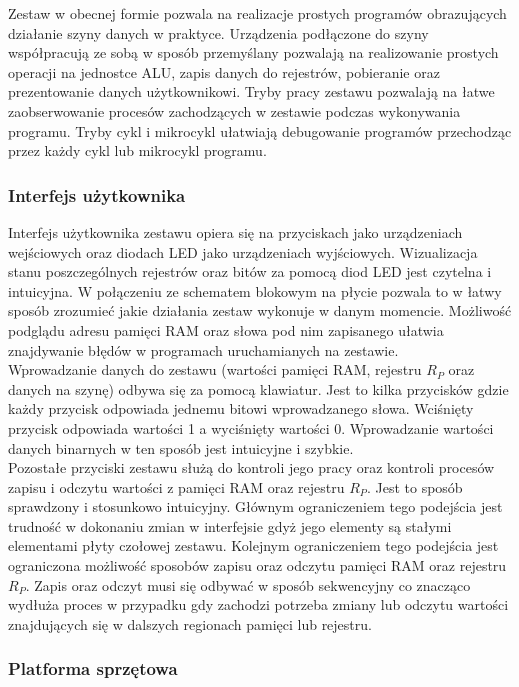 \documentclass[../main.tex]{subfiles}
\begin{document}
    Zestaw w obecnej formie pozwala na realizacje prostych programów obrazujących działanie szyny danych w praktyce. Urządzenia podłączone do szyny
    współpracują ze sobą w sposób przemyślany pozwalają na realizowanie prostych operacji na jednostce ALU, zapis danych do rejestrów, pobieranie
    oraz prezentowanie danych użytkownikowi. Tryby pracy zestawu pozwalają na łatwe zaobserwowanie procesów zachodzących w zestawie podczas
    wykonywania programu. Tryby cykl i mikrocykl ułatwiają debugowanie programów przechodząc przez każdy cykl lub mikrocykl programu.

    \subsubsection{Interfejs użytkownika}

    Interfejs użytkownika zestawu opiera się na przyciskach jako urządzeniach wejściowych oraz diodach LED jako urządzeniach wyjściowych. Wizualizacja
    stanu poszczególnych rejestrów oraz bitów za pomocą diod LED jest czytelna i intuicyjna. W połączeniu ze schematem blokowym na płycie pozwala
    to w łatwy sposób zrozumieć jakie działania zestaw wykonuje w danym momencie. Możliwość podglądu adresu pamięci RAM oraz słowa 
    pod nim zapisanego ułatwia znajdywanie błędów w programach uruchamianych na zestawie.
    \\
    Wprowadzanie danych do zestawu (wartości pamięci RAM, rejestru $R_P$ oraz danych na szynę) odbywa się za pomocą klawiatur. Jest to kilka przycisków
    gdzie każdy przycisk odpowiada jednemu bitowi wprowadzanego słowa. Wciśnięty przycisk odpowiada wartości 1 a wyciśnięty wartości 0.
    Wprowadzanie wartości danych binarnych w ten sposób jest intuicyjne i szybkie.
    \\
    Pozostałe przyciski zestawu służą do kontroli jego pracy oraz kontroli procesów zapisu i odczytu wartości z pamięci RAM oraz rejestru $R_P$.
    Jest to sposób sprawdzony i stosunkowo intuicyjny. Głównym ograniczeniem tego podejścia jest trudność w dokonaniu zmian w interfejsie gdyż
    jego elementy są stałymi elementami płyty czołowej zestawu. Kolejnym ograniczeniem tego podejścia jest ograniczona możliwość sposobów zapisu oraz 
    odczytu pamięci RAM oraz rejestru $R_P$. Zapis oraz odczyt musi się odbywać w sposób sekwencyjny co znacząco wydłuża proces w przypadku gdy 
    zachodzi potrzeba zmiany lub odczytu wartości znajdujących się w dalszych regionach pamięci lub rejestru.

    \subsubsection{Platforma sprzętowa}
\end{document}

